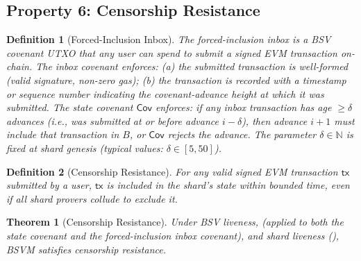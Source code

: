 \documentclass[11pt,a4paper]{article}
\newtheorem{definition}{Definition}[section]
\newtheorem{theorem}{Theorem}[section]
\newcommand{\Cov}{\mathsf{Cov}}
\begin{document}
\subsection{Property 6: Censorship Resistance}

\begin{definition}[Forced-Inclusion Inbox]\label{def:inbox}
The forced-inclusion inbox is a BSV covenant UTXO that any user can spend to submit a signed EVM transaction on-chain. The inbox covenant enforces: (a) the submitted transaction is well-formed (valid signature, non-zero gas); (b) the transaction is recorded with a timestamp or sequence number indicating the covenant-advance height at which it was submitted. The state covenant $\Cov$ enforces: if any inbox transaction has age $\geq \delta$ advances (i.e., was submitted at or before advance $i - \delta$), then advance $i+1$ \emph{must} include that transaction in $B$, or $\Cov$ rejects the advance. The parameter $\delta \in \mathbb{N}$ is fixed at shard genesis (typical values: $\delta \in [5, 50]$).
\end{definition}

\begin{definition}[Censorship Resistance]\label{def:censor}
For any valid signed EVM transaction $\mathsf{tx}$ submitted by a user, $\mathsf{tx}$ is included in the shard's state within bounded time, even if all shard provers collude to exclude it.
\end{definition}

\begin{theorem}[Censorship Resistance]\label{thm:censor}
Under BSV liveness,  (applied to both the state covenant and the forced-inclusion inbox covenant), and shard liveness (), BSVM satisfies censorship resistance.
\end{theorem}
\end{document}
